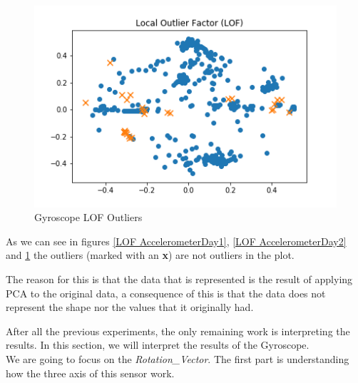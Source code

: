 \documentclass[idxtotoc,hyperref,openany]{labbook} %
\begin{document}
\begin{figure}[h]
\includegraphics[width=0.9\linewidth]{LOF_Plot_Gyroscope.png}
\setlength\belowcaptionskip{-10pt}
\caption{Gyroscope LOF Outliers}
\label{LOF Gyroscope}
\end{figure}

As we can see in figures \ref{LOF AccelerometerDay1}, \ref{LOF AccelerometerDay2} and \ref{LOF Gyroscope} the outliers (marked with an \textbf{x}) are not outliers in the plot. 

The reason for this is that the data that is represented is the result of applying PCA to the original data, a consequence of this is that the data does not represent the shape nor the values that it originally had.


After all the previous experiments, the only remaining work is interpreting the results. In this section, we will interpret the results of the Gyroscope. \\
We are going to focus on the \textit{Rotation\_Vector}. The first part is understanding how the three axis of this sensor work.
\end{document}
